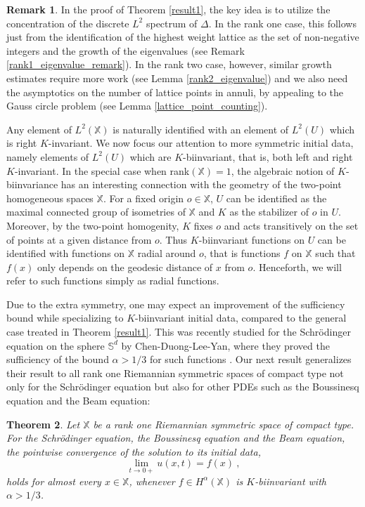 \documentclass[12pt]{amsart}
\newtheorem{theorem}{Theorem}[section]
\theoremstyle{definition}
\newtheorem{remark}[theorem]{Remark}
\newcommand{\Sb}{\mathbb S}%
\newcommand{\X}{\mathbb X}%
\numberwithin{equation}{section}
\begin{document}
\begin{remark} \label{remark_result1_key_ideas}
In the proof of Theorem \ref{result1}, the key idea is to utilize the concentration of the discrete $L^2$ spectrum of $\Delta$. In the rank one case, this follows just from the identification of the highest weight lattice as the set of non-negative integers and the growth of the eigenvalues (see Remark \ref{rank1_eigenvalue_remark}). In the rank two case, however, similar growth estimates require more work (see Lemma \ref{rank2_eigenvalue}) and  we also need the asymptotics on the number of lattice points in annuli, by appealing to the Gauss circle problem (see Lemma \ref{lattice_point_counting}).
\end{remark}

Any element of $L^2(\X)$ is naturally identified with an element of $L^2(U)$ which is right $K$-invariant. We now focus our attention to more symmetric initial data, namely elements of $L^2(U)$ which are $K$-biinvariant, that is, both left and right $K$-invariant. In the special case when rank$(\X)=1$, the algebraic notion of $K$-biinvariance has an interesting connection with the geometry of the two-point homogeneous spaces $\X$. For a fixed origin $o \in \X$, $U$ can be identified as the maximal connected group of isometries of $\X$ and $K$ as the stabilizer of $o$ in $U$. Moreover, by the two-point homogenity, $K$ fixes $o$ and acts transitively on the set of points at a given distance from $o$. Thus $K$-biinvariant functions on $U$ can be identified with functions on $\X$ radial around $o$, that is functions $f$ on $\X$ such that $f(x)$ only depends on the geodesic distance of $x$ from $o$. Henceforth, we will refer to such functions simply as radial functions.

\medskip

Due to the extra symmetry, one may expect an improvement of the sufficiency bound while specializing to $K$-biinvariant initial data, compared to the general case treated in Theorem \ref{result1}. This was recently studied for the Schr\"odinger equation on the sphere $\Sb^d$ by Chen-Duong-Lee-Yan, where they proved the sufficiency of the bound $\alpha>1/3$ for such functions \cite[Theorem 1.3]{CDLY}. Our next result generalizes their result to all rank one Riemannian symmetric spaces of compact type not only for the Schr\"odinger equation but also for other PDEs such as the Boussinesq equation and the Beam equation:
\begin{theorem} \label{result2}
Let $\X$ be a rank one Riemannian symmetric space of compact type. For the Schr\"odinger equation, the Boussinesq equation and the Beam equation, the pointwise convergence of the solution to its initial data,
\begin{equation*}
\displaystyle\lim_{t \to 0+} u(x,t)=f(x)\:,
\end{equation*}
holds for almost every $x \in \X$, whenever $f \in H^\alpha(\X)$ is $K$-biinvariant with $\alpha > 1/3$.
\end{theorem}
\end{document}
